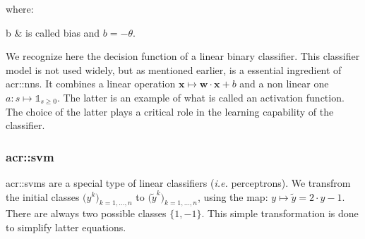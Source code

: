             where:
            \begin{conditions}
                b & is called bias and $b = - \theta $.
            \end{conditions}
            We recognize here the decision function of a linear binary classifier.
            This classifier model is not used widely, but as mentioned earlier, is a essential ingredient of \glspl{acr::nn}.
            It combines a linear operation $\bm{x} \mapsto \bm{w} \cdot \bm{x} + b$ and a non linear one $a: s \mapsto \mathbb{1}_{s \geq 0}$.
            The latter is an example of what is called an activation function.
            The choice of the latter plays a critical role in the learning capability of the classifier.
        \subsubsection{\acrlong*{acr::svm}}
            \glspl{acr::svm} are a special type of linear classifiers (\textit{i.e.} perceptrons).
            We transfrom the initial classes $\big(y^k\big)_{k=1,\dots,n}$ to $\big(\tilde{y}^k\big)_{k=1,\dots,n}$, using the map: $y \mapsto \tilde{y} = 2\cdot y - 1$.
            There are always two possible classes $\{1, -1\}$.
            This simple transformation is done to simplify latter equations.

